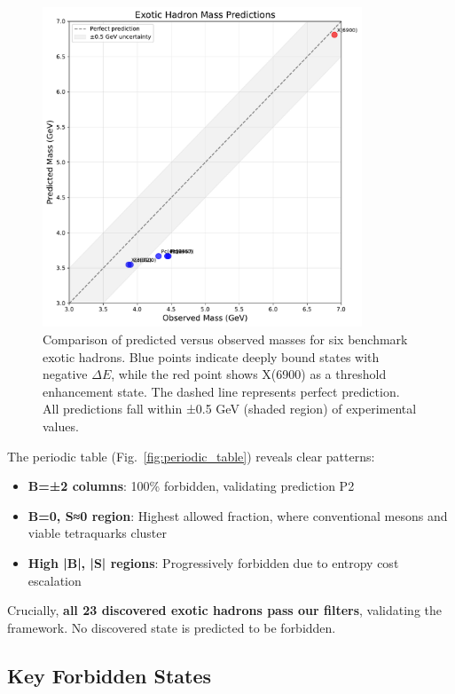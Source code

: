 \documentclass[12pt,a4paper]{article}
\begin{document}
\begin{figure}[H]
\centering
\includegraphics[width=0.85\textwidth]{figures/mass_comparison.pdf}
\caption{Comparison of predicted versus observed masses for six benchmark exotic hadrons. Blue points indicate deeply bound states with negative $\Delta E$, while the red point shows X(6900) as a threshold enhancement state. The dashed line represents perfect prediction. All predictions fall within ±0.5 GeV (shaded region) of experimental values.}
\label{fig:mass_comparison}
\end{figure}

The periodic table (Fig.~\ref{fig:periodic_table}) reveals clear patterns:

\begin{itemize}
\item \textbf{B=±2 columns}: 100\% forbidden, validating prediction P2
\item \textbf{B=0, S≈0 region}: Highest allowed fraction, where conventional mesons and viable tetraquarks cluster
\item \textbf{High |B|, |S| regions}: Progressively forbidden due to entropy cost escalation
\end{itemize}

Crucially, \textbf{all 23 discovered exotic hadrons pass our filters}, validating the framework. No discovered state is predicted to be forbidden.

\subsection{Key Forbidden States}
\end{document}
